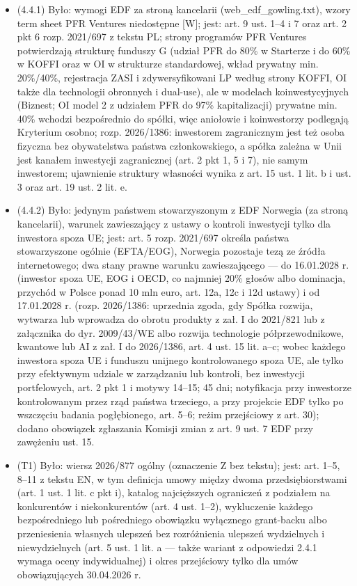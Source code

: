 \documentclass[12pt,a4paper]{report}
\begin{document}
\begin{itemize}
  \item (4.4.1) Było: wymogi EDF za stroną kancelarii (web\_edf\_gowling.txt), wzory term sheet PFR Ventures niedostępne [W]; jest: art. 9 ust. 1–4 i 7 oraz art. 2 pkt 6 rozp. 2021/697 z tekstu PL; strony programów PFR Ventures potwierdzają strukturę funduszy G (udział PFR do 80\% w Starterze i do 60\% w KOFFI oraz w OI w strukturze standardowej, wkład prywatny min. 20\%/40\%, rejestracja ZASI i zdywersyfikowani LP według strony KOFFI, OI także dla technologii obronnych i dual-use), ale w modelach koinwestycyjnych (Biznest; OI model 2 z udziałem PFR do 97\% kapitalizacji) prywatne min. 40\% wchodzi bezpośrednio do spółki, więc aniołowie i koinwestorzy podlegają Kryterium osobno; rozp. 2026/1386: inwestorem zagranicznym jest też osoba fizyczna bez obywatelstwa państwa członkowskiego, a spółka zależna w Unii jest kanałem inwestycji zagranicznej (art. 2 pkt 1, 5 i 7), nie samym inwestorem; ujawnienie struktury własności wynika z art. 15 ust. 1 lit. b i ust. 3 oraz art. 19 ust. 2 lit. e.
  \item (4.4.2) Było: jedynym państwem stowarzyszonym z EDF Norwegia (za stroną kancelarii), warunek zawieszający z ustawy o kontroli inwestycji tylko dla inwestora spoza UE; jest: art. 5 rozp. 2021/697 określa państwa stowarzyszone ogólnie (EFTA/EOG), Norwegia pozostaje tezą ze źródła internetowego; dwa stany prawne warunku zawieszającego — do 16.01.2028 r. (inwestor spoza UE, EOG i OECD, co najmniej 20\% głosów albo dominacja, przychód w Polsce ponad 10 mln euro, art. 12a, 12c i 12d ustawy) i od 17.01.2028 r. (rozp. 2026/1386: uprzednia zgoda, gdy Spółka rozwija, wytwarza lub wprowadza do obrotu produkty z zał. I do 2021/821 lub z załącznika do dyr. 2009/43/WE albo rozwija technologie półprzewodnikowe, kwantowe lub AI z zał. I do 2026/1386, art. 4 ust. 15 lit. a–c; wobec każdego inwestora spoza UE i funduszu unijnego kontrolowanego spoza UE, ale tylko przy efektywnym udziale w zarządzaniu lub kontroli, bez inwestycji portfelowych, art. 2 pkt 1 i motywy 14–15; 45 dni; notyfikacja przy inwestorze kontrolowanym przez rząd państwa trzeciego, a przy projekcie EDF tylko po wszczęciu badania pogłębionego, art. 5–6; reżim przejściowy z art. 30); dodano obowiązek zgłaszania Komisji zmian z art. 9 ust. 7 EDF przy zawężeniu ust. 15.
  \item (T1) Było: wiersz 2026/877 ogólny (oznaczenie Z bez tekstu); jest: art. 1–5, 8–11 z tekstu EN, w tym definicja umowy między dwoma przedsiębiorstwami (art. 1 ust. 1 lit. c pkt i), katalog najcięższych ograniczeń z podziałem na konkurentów i niekonkurentów (art. 4 ust. 1–2), wykluczenie każdego bezpośredniego lub pośredniego obowiązku wyłącznego grant-backu albo przeniesienia własnych ulepszeń bez rozróżnienia ulepszeń wydzielnych i niewydzielnych (art. 5 ust. 1 lit. a — także wariant z odpowiedzi 2.4.1 wymaga oceny indywidualnej) i okres przejściowy tylko dla umów obowiązujących 30.04.2026 r.

\end{itemize}
\end{document}
